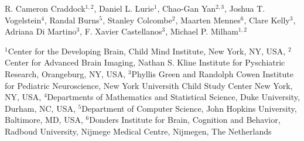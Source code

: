 R. Cameron Craddock$^{1,2}$,
Daniel L. Lurie$^1$, 
Chao-Gan Yan$^{2,3}$,
Joshua T. Vogelstein$^4$,
Randal Burns$^5$,
Stanley Colcombe$^2$,
Maarten Mennes$^6$,
Clare Kelly$^3$,
Adriana Di Martino$^3$,
F. Xavier Castellanos$^3$,
Michael P. Milham$^{1,2}$



$^1${Center for the Developing Brain, Child Mind Institute, New York, NY, USA},
$^2${Center for Advanced Brain Imaging, Nathan S. Kline Institute for Pyschiatric Research, Orangeburg, NY, USA},
$^3${Phyllis Green and Randolph Cowen Institute for Pediatric Neuroscience, New York Universith Child Study Center New York, NY, USA},
$^4${Departments of Mathematics and Statistical Science, Duke University, Durham, NC, USA},
$^5${Department of Computer Science, John Hopkins University, Baltimore, MD, USA},
$^6${Donders Institute for Brain, Cognition and Behavior, Radboud University, Nijmege Medical Centre, Nijmegen, The Netherlands}

